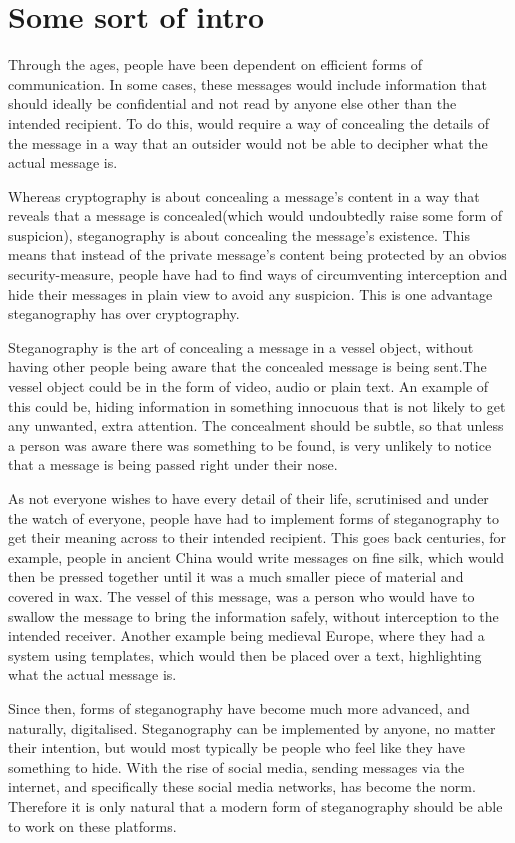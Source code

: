 \section{Some sort of intro}
Through the ages, people have been dependent on efficient forms of communication. In some cases, these messages would include information that should ideally be confidential and not read by anyone else other than the intended recipient. To do this, would require a way of concealing the details of the message in a way that an outsider would not be able to decipher what the actual message is.

Whereas cryptography is about concealing a message's content in a way that reveals that a message is concealed(which would undoubtedly raise some form of suspicion), steganography is about concealing the message's existence. This means that instead of the private message's content being protected by an obvios security-measure, people have had to find ways of circumventing interception and hide their messages in plain view to avoid any suspicion. This is one advantage steganography has over cryptography. 

Steganography is the art of concealing a message in a vessel object, without having other people being aware that the concealed message is being sent.\cite{Anderson1998}The vessel object could be in the form of video, audio or plain text. An example of this could be, hiding information in something innocuous that is not likely to get any unwanted, extra attention. The concealment should be subtle, so that unless a person was aware there was something to be found, is very unlikely to notice that a message is being passed right under their nose.

As not everyone wishes to have every detail of their life, scrutinised and under the watch of everyone, people have had to implement forms of steganography to get their meaning across to their intended recipient. This goes back centuries, for example, people in ancient China would write messages on fine silk, which would then be pressed together until it was a much smaller piece of material and covered in wax. The vessel of this message, was a person who would have to swallow the message to bring the information safely, without interception to the intended receiver. \cite{Singh2001} Another example being medieval Europe, where they had a system using templates, which would then be placed over a text, highlighting what the actual message is.\cite{Anderson1998}

Since then, forms of steganography have become much more advanced, and naturally, digitalised. Steganography can be implemented by anyone, no matter their intention, but would most typically be people who feel like they have something to hide. With the rise of social media, sending messages via the internet, and specifically these social media networks, has become the norm. Therefore it is only natural that a modern form of steganography should be able to work on these platforms. 
